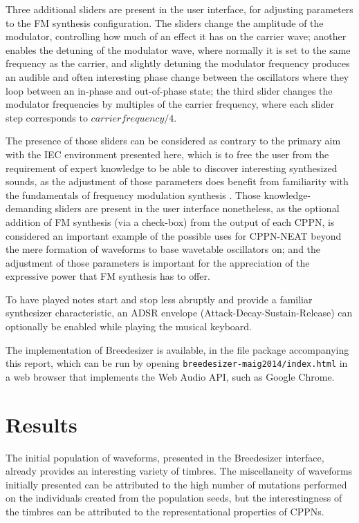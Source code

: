 \documentclass[conference]{IEEEtran}
\begin{document}
Three additional sliders are present in the user interface, for adjusting parameters to the FM synthesis configuration.  The sliders change the amplitude of the modulator, controlling how much of an effect it has on the carrier wave; another enables the detuning of the modulator wave, where normally it is set to the same frequency as the carrier, and slightly detuning the modulator frequency produces an audible and often interesting phase change between the oscillators where they loop between an in-phase and out-of-phase state; the third slider changes the modulator frequencies by multiples of the carrier frequency, where each slider step corresponds to $carrier frequency / 4$.

The presence of those sliders can be considered as contrary to the primary aim with the IEC environment presented here, which is to free the user from the requirement of expert knowledge to be able to discover interesting synthesized sounds, as the adjustment of those parameters does benefit from familiarity with the fundamentals of frequency modulation synthesis \cite{Introduction-to-FM}.  Those knowledge-demanding sliders are present in the user interface nonetheless, as the optional addition of FM synthesis (via a check-box) from the output of each CPPN, is considered an important example of the possible uses for CPPN-NEAT beyond the mere formation of waveforms to base wavetable oscillators on; and the adjustment of those parameters is important for the appreciation of the expressive power that FM synthesis has to offer.

To have played notes start and stop less abruptly and provide a familiar synthesizer characteristic, an ADSR envelope (Attack-Decay-Sustain-Release) can optionally be enabled while playing the musical keyboard.

The implementation of Breedesizer is available, in the file package accompanying this report, which can be run by opening \texttt{breedesizer-maig2014/index.html} in a web browser that implements the Web Audio API, such as Google Chrome.


\section{Results}

The initial population of waveforms, presented in the Breedesizer interface, already provides an interesting variety of timbres.  The miscellaneity of waveforms initially presented can be attributed to the high number of mutations performed on the individuals created from the population seeds, but the interestingness of the timbres can be attributed to the representational properties of CPPNs.
\end{document}

